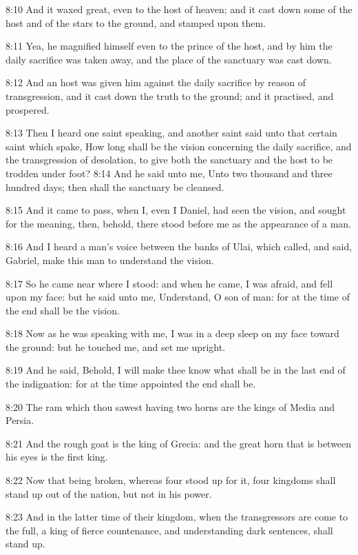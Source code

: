 8:10 And it waxed great, even to the host of heaven; and it cast down
some of the host and of the stars to the ground, and stamped upon
them.

8:11 Yea, he magnified himself even to the prince of the host, and by
him the daily sacrifice was taken away, and the place of the sanctuary
was cast down.

8:12 And an host was given him against the daily sacrifice by reason
of transgression, and it cast down the truth to the ground; and it
practised, and prospered.

8:13 Then I heard one saint speaking, and another saint said unto that
certain saint which spake, How long shall be the vision concerning the
daily sacrifice, and the transgression of desolation, to give both the
sanctuary and the host to be trodden under foot?  8:14 And he said
unto me, Unto two thousand and three hundred days; then shall the
sanctuary be cleansed.

8:15 And it came to pass, when I, even I Daniel, had seen the vision,
and sought for the meaning, then, behold, there stood before me as the
appearance of a man.

8:16 And I heard a man's voice between the banks of Ulai, which
called, and said, Gabriel, make this man to understand the vision.

8:17 So he came near where I stood: and when he came, I was afraid,
and fell upon my face: but he said unto me, Understand, O son of man:
for at the time of the end shall be the vision.

8:18 Now as he was speaking with me, I was in a deep sleep on my face
toward the ground: but he touched me, and set me upright.

8:19 And he said, Behold, I will make thee know what shall be in the
last end of the indignation: for at the time appointed the end shall
be.

8:20 The ram which thou sawest having two horns are the kings of Media
and Persia.

8:21 And the rough goat is the king of Grecia: and the great horn that
is between his eyes is the first king.

8:22 Now that being broken, whereas four stood up for it, four
kingdoms shall stand up out of the nation, but not in his power.

8:23 And in the latter time of their kingdom, when the transgressors
are come to the full, a king of fierce countenance, and understanding
dark sentences, shall stand up.

